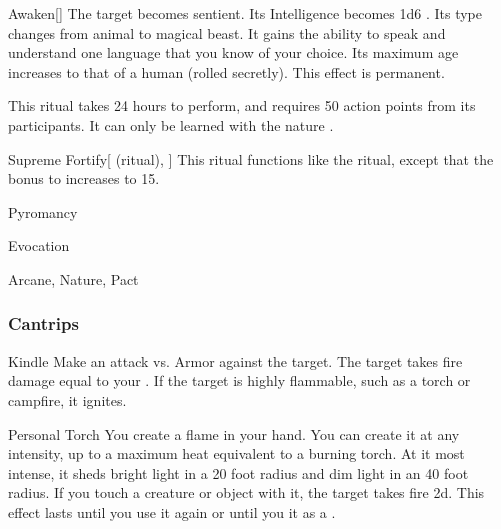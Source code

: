 \lowercase{\hypertarget{spell:Awaken}{}}\label{spell:Awaken}
\begin{apability}[Rank 6]{\hypertarget{spell:Awaken}{Awaken}}[]
The target becomes sentient.
Its Intelligence becomes 1d6 .
Its type changes from animal to magical beast.
It gains the ability to speak and understand one language that you know of your choice.
Its maximum age increases to that of a human (rolled secretly).
This effect is permanent.

This ritual takes 24 hours to perform, and requires 50 action points from its participants.
It can only be learned with the nature .
\end{apability}
\vspace{0.25em}



\lowercase{\hypertarget{spell:Supreme Fortify}{}}\label{spell:Supreme Fortify}
\begin{attuneability}[Rank 7]{\hypertarget{spell:Supreme Fortify}{Supreme Fortify}}[ (ritual), ]
This ritual functions like the  ritual, except that the bonus to  increases to 15.
\end{attuneability}
\vspace{0.25em}


\newpage
\begin{spellsection}{Pyromancy}

\begin{spellheader}
\end{spellheader}


 Evocation

 Arcane, Nature, Pact

\subsubsection{Cantrips}


\begin{freeability}{Kindle}
Make an attack vs. Armor against the target.
\hit The target takes fire damage equal to your .
If the target is highly flammable, such as a torch or campfire, it ignites.
\end{freeability}


\begin{freeability}{Personal Torch}
You create a flame in your hand.
You can create it at any intensity, up to a maximum heat equivalent to a burning torch.
At it most intense, it sheds bright light in a 20 foot radius and dim light in an 40 foot radius.
If you touch a creature or object with it, the target takes fire  \minus2d.
This effect lasts until you use it again or until you  it as a .
\end{freeability}

\end{spellsection}



